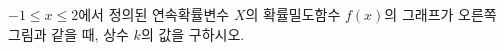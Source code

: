 \noindent\begin{minipage}[t]{0.58\linewidth}\vspace{0pt}\raggedright $-1\le x\le 2$에서 정의된 연속확률변수 $X$의 확률밀도함수 $f(x)$의 그래프가 오른쪽 그림과 같을 때, 상수 $k$의 값을 구하시오.\end{minipage}\hfill\begin{minipage}[t]{0.4\linewidth}\vspace{0pt}\centering \resizebox{\ifdim\width>\linewidth\linewidth\else\width\fi}{!}{}\end{minipage}\par
